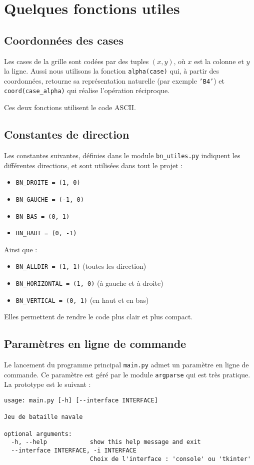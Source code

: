 \chapter{Quelques fonctions utiles}

\section{Coordonnées des cases}
Les cases de la grille sont codées par des tuples $(x,y)$, où $x$ est la colonne et $y$ la ligne. Aussi nous utilisons la fonction \texttt{alpha(case)} qui, à partir des coordonnées, retourne sa représentation naturelle (par exemple \texttt{'B4'}) et \texttt{coord(case\_alpha)} qui réalise l'opération réciproque.

Ces deux fonctions utilisent le code ASCII.

\section{Constantes de direction}
Les constantes suivantes, définies dans le module \texttt{bn\_utiles.py} indiquent les différentes directions, et sont utilisées dans tout le projet :
\begin{itemize}
\item \texttt{BN\_DROITE = (1, 0)}
\item \texttt{BN\_GAUCHE = (-1, 0)}
\item \texttt{BN\_BAS = (0, 1)}
\item \texttt{BN\_HAUT = (0, -1)}
\end{itemize}
Ainsi que :
\begin{itemize}
\item \texttt{BN\_ALLDIR = (1, 1)} (toutes les direction)
\item \texttt{BN\_HORIZONTAL = (1, 0)} (à gauche et à droite)
\item \texttt{BN\_VERTICAL = (0, 1)} (en haut et en bas)
\end{itemize}
Elles permettent de rendre le code plus clair et plus compact.

\section{Paramètres en ligne de commande}
Le lancement du programme principal \texttt{main.py} admet un paramètre en ligne de commande. Ce paramètre est géré par le module \texttt{argparse} qui est très pratique. La prototype est le suivant :

\begin{verbatim}
usage: main.py [-h] [--interface INTERFACE]

Jeu de bataille navale

optional arguments:
  -h, --help            show this help message and exit
  --interface INTERFACE, -i INTERFACE
                        Choix de l'interface : 'console' ou 'tkinter'
\end{verbatim}